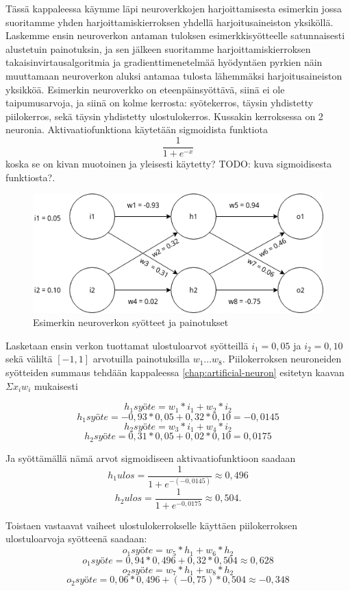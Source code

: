 \documentclass[finnish]{tktltiki2}
\theoremstyle{definition}
\theoremstyle{remark}
\begin{document}
  Tässä kappaleessa käymme läpi neuroverkkojen harjoittamisesta esimerkin jossa suoritamme yhden harjoittamiskierroksen yhdellä harjoitusaineiston yksiköllä. Laskemme ensin neuroverkon antaman tuloksen esimerkkisyötteelle satunnaisesti alustetuin painotuksin, ja sen jälkeen suoritamme harjoittamiskierroksen takaisinvirtausalgoritmia ja gradienttimenetelmää hyödyntäen pyrkien näin muuttamaan neuroverkon aluksi antamaa tulosta lähemmäksi harjoitusaineiston yksikköä. Esimerkin neuroverkko on eteenpäinsyöttävä, siinä ei ole taipumusarvoja, ja siinä on kolme kerrosta: syötekerros, täysin yhdistetty piilokerros, sekä täysin yhdistetty ulostulokerros. Kussakin kerroksessa on 2 neuronia. Aktivaatiofunktiona käytetään sigmoidista funktiota $$ \frac{1}{1 + e^{-x}} $$ koska se on kivan muotoinen ja yleisesti käytetty? TODO: kuva sigmoidisesta funktiosta?.

    \begin{figure}[h]
    \centering
    \includegraphics[scale=0.6]{draw-io-backprop-example}
    \caption{Esimerkin neuroverkon syötteet ja painotukset}
    \label{pic:backprop-example}
    \end{figure}

  Lasketaan ensin verkon tuottamat ulostuloarvot syötteillä $i_1 = 0,05$ ja $i_2 = 0,10$ sekä väliltä $[-1, 1]$ arvotuilla painotuksilla $w_1...w_8$. Piilokerroksen neuroneiden syötteiden summaus tehdään kappaleessa \ref{chap:artificial-neuron} esitetyn kaavan $\Sigma x_i w_i$ mukaisesti
  
  $$h_{1}syöte = w_1 * i_1 + w_2 * i_2$$
  $$h_{1}syöte = -0,93 * 0,05 + 0,32 * 0,10 = -0,0145$$
  $$h_{2}syöte = w_3 * i_1 + w_4 * i_2$$
  $$h_{2}syöte = 0,31 * 0,05 + 0,02 * 0,10 = 0,0175$$

  Ja syöttämällä nämä arvot sigmoidiseen aktivaatiofunktioon saadaan
  $$h_{1}ulos = \frac{1}{1 + e^{-(-0,0145)}} \approx 0,496$$
  $$h_{2}ulos = \frac{1}{1 + e^{-0,0175}} \approx 0,504.$$

  Toistaen vastaavat vaiheet ulostulokerrokselle käyttäen piilokerroksen ulostuloarvoja syötteenä saadaan:
  $$o_{1}syöte = w_5 * h_1 + w_6 * h_2$$
  $$o_{1}syöte = 0,94 * 0,496 + 0,32 * 0,504 \approx 0,628$$
  $$o_{2}syöte = w_7 * h_1 + w_8 * h_2$$
  $$o_{2}syöte = 0,06 * 0,496 + (-0,75) * 0,504 \approx -0,348$$
\end{document}
